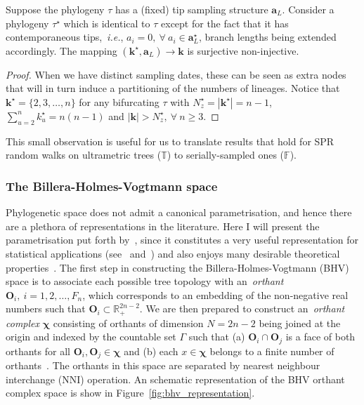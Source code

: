 \begin{remark}
\label{rmk:k_kprime}
 Suppose the phylogeny $\tau$ has a (fixed) tip sampling structure $\boldsymbol a_L$. 
 Consider a phylogeny $\tau^\star$ which is identical to $\tau$ except for the fact that it has contemporaneous tips,~\textit{i.e.}, $a_i = 0,\: \forall \: a_i \in \boldsymbol a^\star_L$, branch lengths being extended accordingly.
 The mapping $ (\boldsymbol k^\star, \boldsymbol a_L) \to \boldsymbol k$ is surjective non-injective.
\end{remark}
\begin{proof}
 When we have distinct sampling dates, these can be seen as extra nodes that will in turn induce a partitioning of the numbers of lineages.
 Notice that $\boldsymbol k^\star = \{ 2, 3, \ldots, n\}$ for any bifurcating $\tau$ with $N^\star_z = |\boldsymbol k^\star| = n - 1$, $\sum_{u = 2}^n  k_u^\star = n(n-1)$ and  $|\boldsymbol k| > N^\star_z, \: \forall \: n\geq3$.
\end{proof}
This small observation is useful for us to translate results that hold for SPR random walks on ultrametric trees ($\mathbb{T}$) to serially-sampled  ones ($\mathbb{F}$).

\subsubsection{The Billera-Holmes-Vogtmann space}

Phylogenetic space does not admit a canonical parametrisation, and hence there are a plethora of representations in the literature.
Here I will present the parametrisation put forth by~\cite{Billera2001}, since it constitutes a very useful representation for statistical applications (see~\cite{Willis2017} and~\cite{Dinh2017}) and also enjoys many  desirable theoretical properties~\citep{Steel2014,StJohn2017}.
The first step in constructing the Billera-Holmes-Vogtmann (BHV) space is to associate each possible tree topology with an~\textit{orthant} $\boldsymbol O_i,\: i = 1, 2, \ldots, F_n$, which corresponds to an embedding of the non-negative real numbers such that $\boldsymbol O_i \subset \mathbb{R}_+^{2n-2}$.
We are then prepared to construct an~\textit{orthant complex} $\boldsymbol \chi$ consisting of orthants of dimension $N = 2n-2$ being joined at the origin and indexed by the countable set $\Gamma$ such that (a) $\boldsymbol O_i \cap \boldsymbol O_j$ is a face of both orthants for all $\boldsymbol O_i,\boldsymbol O_j \in \boldsymbol
\chi$ and (b) each $x \in \boldsymbol\chi$ belongs to a finite number of orthants~\citep{Dinh2017}.
The orthants in this space are separated by nearest neighbour interchange (NNI) operation.
An schematic representation of the BHV orthant complex space is show in Figure~\ref{fig:bhv_representation}.

